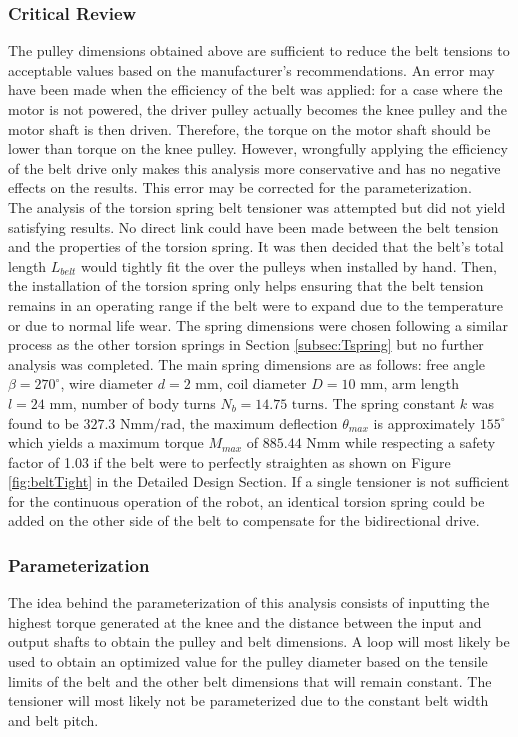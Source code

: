 \subsubsection{Critical Review}
The pulley dimensions obtained above are sufficient to reduce the belt tensions to acceptable values based on the manufacturer's recommendations. An error may have been made when the efficiency of the belt was applied: for a case where the motor is not powered, the driver pulley actually becomes the knee pulley and the motor shaft is then driven. Therefore, the torque on the motor shaft should be lower than torque on the knee pulley. However, wrongfully applying the efficiency of the belt drive only makes this analysis more conservative and has no negative effects on the results. This error may be corrected for the parameterization. \\

The analysis of the torsion spring belt tensioner was attempted but did not yield satisfying results. No direct link could have been made between the belt tension and the properties of the torsion spring. It was then decided that the belt's total length $L_{belt}$ would tightly fit the over the pulleys when installed by hand. Then, the installation of the torsion spring only helps ensuring that the belt tension remains in an operating range if the belt were to expand due to the temperature or due to normal life wear. The spring dimensions were chosen following a similar process as the other torsion springs in Section \ref{subsec:Tspring} but no further analysis was completed. The main spring dimensions are as follows: free angle $\beta = 270^{\circ}$, wire diameter $d = 2\text{ mm}$, coil diameter $D = 10\text{ mm}$, arm length $l = 24\text{ mm}$, number of body turns $N_b = 14.75\text{ turns}$. The spring constant $k$ was found to be $327.3\text{ Nmm/rad}$, the maximum deflection $\theta_{max}$ is approximately $155^{\circ}$ which yields a maximum torque $M_{max}$ of $885.44\text{ Nmm}$ while respecting a safety factor of 1.03 if the belt were to perfectly straighten as shown on Figure \ref{fig:beltTight} in the Detailed Design Section. If a single tensioner is not sufficient for the continuous operation of the robot, an identical torsion spring could be added on the other side of the belt to compensate for the bidirectional drive.

\subsubsection{Parameterization}
The idea behind the parameterization of this analysis consists of inputting the highest torque generated at the knee and the distance between the input and output shafts to obtain the pulley and belt dimensions. A loop will most likely be used to obtain an optimized value for the pulley diameter based on the tensile limits of the belt and the other belt dimensions that will remain constant. The tensioner will most likely not be parameterized due to the constant belt width and belt pitch.
